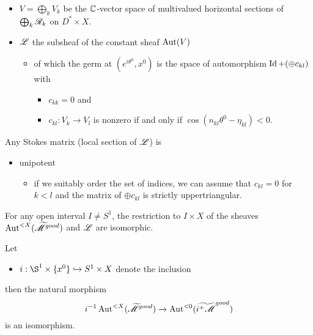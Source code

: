 \begin{itemize}
  \item $V=\bigoplus_kV_k$ be the $\mathbb{C}$-vector space of multivalued horizontal
    sections of $\bigoplus_k\mathscr{R}_k$ on $D^*\times X$.
  \item $\mathscr{L}$ the subsheaf of the constant sheaf $\operatorname{Aut}(V)$
    \begin{itemize}
      \item of which the germ at $(e^{i\theta^0},x^0)$ is
        the space of automorphism $\operatorname{Id}+(\oplus c_{kl})$ with
        \begin{itemize}
          \item $c_{kk}=0$ and
          \item $c_{kl}:V_k\to V_l$ is nonzero if and only if
            $\cos(n_{kl}\theta^0-\eta_{kl})<0$.
        \end{itemize}
    \end{itemize}
\end{itemize}
\begin{rem}
  Any Stokes matrix (local section of $\mathscr{L}$) is 
  \begin{itemize}
    \item unipotent
      \begin{itemize}
        \item if we suitably order the set of indices, we can assume that
          $c_{kl}=0$ for $k<l$ and the matrix of $\oplus c_{kl}$ is strictly
          uppertriangular.
      \end{itemize}
  \end{itemize}
\end{rem}
\begin{cor}
  For any open interval $I\neq S^1$, the restriction to $I\times X$ of the
  sheaves $\operatorname{Aut}^{<X}(\widetilde{\mathscr{M}}^{good})$ and $\mathscr{L}$ are isomorphic.
  \begin{comment}
    \begin{proof}[Proof]
      Let $I\neq S^1$\dots
    \end{proof}
  \end{comment}
\end{cor}
\begin{cor}
  Let
  \begin{itemize}
    \item $i:\S^1\times\{x^0\}\hookrightarrow S^1\times X$ denote the inclusion
  \end{itemize}
  then the natural morphism
  \[
    i^{-1}\operatorname{Aut}^{<X}(\widetilde{\mathscr{M}}^{good})\to\operatorname{Aut}^{<0}(\widetilde{i^+\mathscr{M}}^{good})
  \]
  is an isomorphism.
\end{cor}
